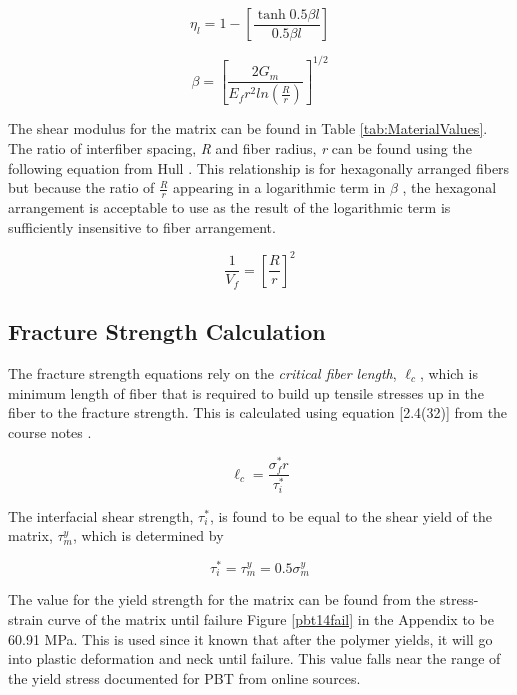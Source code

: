 \documentclass[11pt]{article}
\begin{document}
\begin{equation}
\eta_l = 1- \left[\frac{\tanh 0.5\beta l}{0.5\beta l} \right]
\end{equation}

\begin{equation}
\beta=\left[\frac{2G_m}{E_fr^2 ln(\frac{R}{r})}\right]^{1/2}
\end{equation}

The shear modulus for the matrix can be found in Table \ref{tab:MaterialValues}. The ratio of interfiber spacing, \textit{R} and fiber radius, \textit{r} can be found using the following equation from Hull \cite{hull}. This relationship is for hexagonally arranged fibers but because the ratio of \(\frac{R}{r}\) appearing in a logarithmic term in \(\beta\) , the hexagonal arrangement is acceptable to use as the result of the logarithmic term is sufficiently insensitive to fiber arrangement.

\begin{equation}
\frac{1}{V_f}=\left[\frac{R}{r}\right]^2
\end{equation}

\subsection{Fracture Strength Calculation}

The fracture strength equations rely on the \textit{critical fiber length}, \(\ell_c\), which is minimum length of fiber that is required to build up tensile stresses up in the fiber to the fracture strength. This is calculated using equation [2.4(32)] from the course notes \cite{course_notes}.

\begin{equation}
\ell_c = \frac{\sigma^*_f r}{\tau^*_i}
\end{equation}

The interfacial shear strength, \(\tau^*_i\), is found to be equal to the shear yield of the matrix, \(\tau^y_m\), which is determined by

\begin{equation}
\tau^*_i = \tau^y_m = 0.5 \sigma^y_m
\end{equation}

The value for the yield strength for the matrix can be found from the stress-strain curve of the matrix until failure Figure \ref{pbt14fail} in the Appendix to be 60.91 MPa. This is used since it known that after the polymer yields, it will go into plastic deformation and neck until failure. This value falls near the range of the yield stress documented for PBT from online sources.
\end{document}
